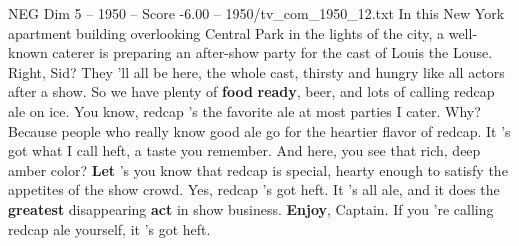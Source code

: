 \begin{textsample}{NEG Dim 5 – 1950 – Score -6.00 – 1950/tv\_com\_1950\_12.txt}  \label{ex:f5_neg_043}
In this New York apartment building overlooking Central Park in the lights of the city, a well-known caterer is preparing an after-show party for the cast of Louis the Louse.
Right, Sid?
They 'll all be here, the whole cast, thirsty and hungry like all actors after a show.
So we have plenty of \textbf{food} \textbf{ready}, beer, and lots of calling redcap ale on ice.
You know, redcap 's the favorite ale at most parties I cater.
Why?
Because people who really know good ale go for the heartier flavor of redcap.
It 's got what I call heft, a taste you remember.
And here, you see that rich, deep amber color? \textbf{Let} 's you know that redcap is special, hearty enough to satisfy the appetites of the show crowd.
Yes, redcap 's got heft.
It 's all ale, and it does the \textbf{greatest} disappearing \textbf{act} in show business. \textbf{Enjoy}, Captain.
If you 're calling redcap ale yourself, it 's got heft.

\end{textsample}
